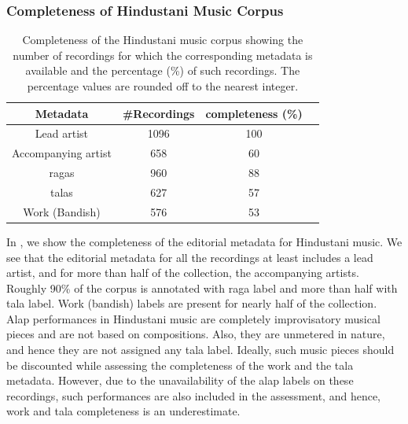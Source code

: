 \subsubsection{Completeness of Hindustani Music Corpus}
\label{sec:corpus_completeness_of_hindustani_music_corpus}

\begin{table}
	\begin{centering}
		\begin{tabular}{ c c c c}
			\hline
			Metadata	 		&  \#Recordings	& completeness (\%)\\
			\hline
			Lead artist			& 	1096	& 	100	\\						
			Accompanying artist	& 	658		& 	60	\\
			\Glspl{raga}		& 	960		& 	88	\\
			\Glspl{tala}		& 	627		& 	57	\\
			Work (Bandish)		& 	576		& 	53	\\
			
			\hline
			
		\end{tabular}
		\par \end{centering}	
	\caption[Completeness of the Hindustani music corpus]{Completeness of the Hindustani music corpus showing the number of recordings for which the corresponding metadata is available and the percentage (\%) of such recordings. The percentage values are rounded off to the nearest integer.} 
	\label{tab:completeness_hindustani_corpus}
\end{table}


In , we show the completeness of the editorial metadata for Hindustani music. We see that the editorial metadata for all the recordings at least includes a lead artist, and for more than half of the collection, the accompanying artists. Roughly 90\% of the corpus is annotated with \gls{raga} label and more than half with \gls{tala} label. Work (bandish) labels are present for nearly half of the collection. \gls{Alap} performances in Hindustani music are completely improvisatory musical pieces and are not based on compositions. Also, they are unmetered in nature, and hence they are not assigned any \gls{tala} label. Ideally, such music pieces should be discounted while assessing the completeness of the work and the \gls{tala} metadata. However, due to the unavailability of the \gls{alap} labels on these recordings, such performances are also included in the assessment, and hence, work and \gls{tala} completeness is an underestimate.



